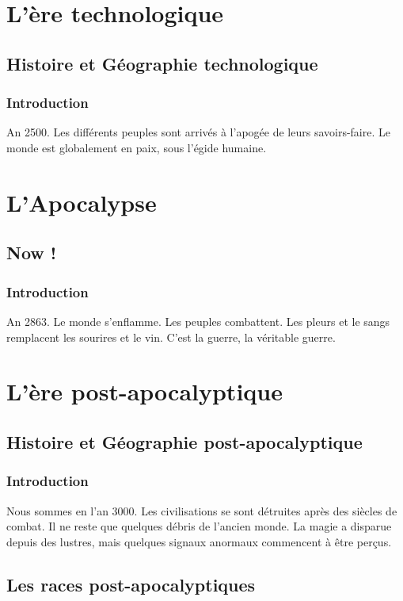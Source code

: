 \documentclass{book}
\begin{document}
\part{L'ère technologique}
\chapter{Histoire et Géographie technologique}
\section{Introduction}
An 2500. Les différents peuples sont arrivés à l'apogée de leurs savoirs-faire. Le monde est globalement en paix, sous l'égide humaine.


\part{L'Apocalypse}
\chapter{Now !}
\section{Introduction}
An 2863. Le monde s'enflamme. Les peuples combattent. Les pleurs et le sangs remplacent les sourires et le vin. C'est la guerre, la véritable guerre.


\part{L'ère post-apocalyptique}
\chapter{Histoire et Géographie post-apocalyptique}
\section{Introduction}
Nous sommes en l'an 3000. Les civilisations se sont détruites après des siècles de combat. 
Il ne reste que quelques débris de l'ancien monde. 
La magie a disparue depuis des lustres, mais quelques signaux anormaux commencent à être perçus.


\chapter{Les races post-apocalyptiques}


\end{document}

